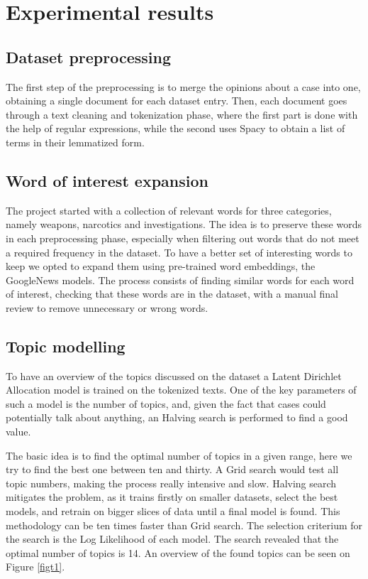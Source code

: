 \section{Experimental results}

\subsection{Dataset preprocessing}

The first step of the preprocessing is to merge the opinions about a 
case into one, obtaining a single document for each dataset entry.  
Then, each document goes through a text cleaning and tokenization phase, 
where the first part is done with the help of regular expressions, 
while the second uses Spacy to obtain a list of terms in their lemmatized form.

\subsection{Word of interest expansion}

The project started with a collection of relevant words for three categories, 
namely weapons, narcotics and investigations. The idea is to preserve these words
in each preprocessing phase, especially when filtering out words 
that do not meet a required frequency in the dataset. 
To have a better set of interesting words to keep we opted to expand them 
using pre-trained word embeddings, the GoogleNews models.
The process consists of finding similar words for each word 
of interest, checking that these words are in the dataset, 
with a manual final review to remove unnecessary or wrong words.

\subsection{Topic modelling}

To have an overview of the topics discussed on the dataset a Latent 
Dirichlet Allocation model is trained on the tokenized texts.
One of the key parameters of such a model is the number of topics, and, 
given the fact that cases could potentially talk about anything, an 
Halving search is performed to find a good value.

The basic idea is to find the optimal number of topics in a given range, 
here we try to find the best one between ten and thirty. A Grid search would 
test all topic numbers, making the process really intensive and slow. 
Halving search 
mitigates the problem, as it trains firstly on smaller datasets, select 
the best models, and retrain on bigger slices of data until a final model 
is found. This methodology can be ten times faster than Grid search. 
The selection criterium for the search is the Log Likelihood of each model.
The search revealed that the optimal number of topics is 14. An overview of the found topics 
can be seen on Figure \vref{figt1}.

